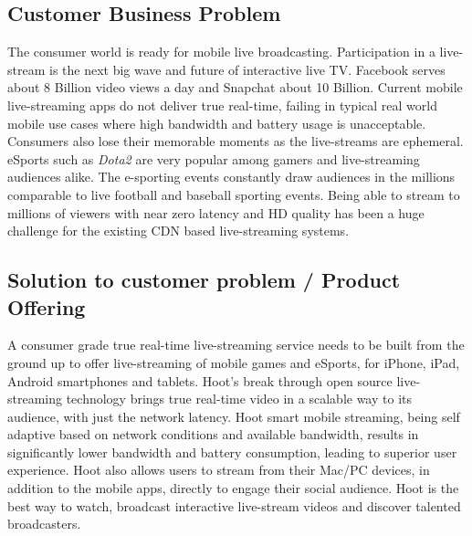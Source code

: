 \documentclass{article}
\begin{document}
\subsection{Customer Business Problem}
The consumer world is ready for mobile live broadcasting. Participation in a live-stream is the next big wave and future of interactive live TV. Facebook serves about 8 Billion video views a day and Snapchat about 10 Billion. Current mobile live-streaming apps do not deliver true real-time, failing in typical real world mobile use cases where high bandwidth and battery usage is unacceptable. Consumers also lose their memorable moments as the live-streams are ephemeral. eSports such as \emph{Dota2} are very popular among gamers and live-streaming audiences alike. The e-sporting events constantly draw audiences in the millions comparable to live football and baseball sporting events. Being able to stream to millions of viewers with near zero latency and HD quality has been a huge challenge for the existing CDN based live-streaming systems.

\subsection{Solution to customer problem / Product Offering}
A consumer grade true real-time live-streaming service needs to be built from the ground up to offer live-streaming of mobile games and eSports, for iPhone, iPad, Android smartphones and tablets. Hoot's break through open source live-streaming technology brings true real-time video in a scalable way to its audience, with just the network latency. Hoot smart mobile streaming, being self adaptive based on network conditions and available bandwidth, results in significantly lower bandwidth and battery consumption, leading to superior user experience. Hoot also allows users to stream from their Mac/PC devices, in addition to the mobile apps, directly to engage their social audience. Hoot is the best way to watch, broadcast interactive live-stream videos and discover talented broadcasters.

%
\end{document}
